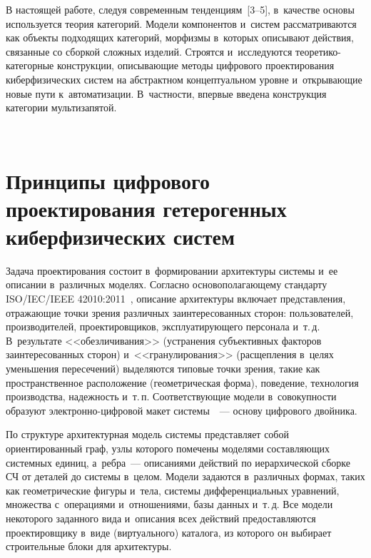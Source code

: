 \begin{multicols}{2}
В настоящей работе, следуя современным тенденциям~[3--5], в~качестве 
основы используется тео\-рия категорий. Модели компонентов и~систем 
рассматриваются как объекты подходящих категорий, морфизмы в~которых 
описывают действия, связанные со сборкой сложных изделий. Строятся 
и~исследуются тео\-ре\-ти\-ко-ка\-те\-гор\-ные конструкции, описывающие 
методы цифрового проектирования киберфизических систем на абстрактном 
концептуальном уровне и~открывающие новые пути к~автоматизации. 
В~частности, впервые введена конструкция категории мультизапятой.

\begin{figure*}[b] %
\vspace*{1pt}
 \begin{center}
 \mbox{%
 \epsfxsize=118mm  
 }
  \end{center}
\vspace*{-9pt}
\end{figure*}

\section{Принципы цифрового проектирования гетерогенных 
киберфизических систем}

Задача проектирования состоит в~формировании архитектуры системы и~ее 
описании в~различных моделях. Согласно основополагающему %
стандарту 
ISO/IEC/IEEE 42010:2011~\cite{6-kov}, описание \mbox{архитектуры} включает 
представления, отра\-жа\-ющие точки зрения различных заинтересованных 
сторон: пользователей, производителей, {проектировщиков}, эксплуатирующего 
персонала и~т.\,д. В~{результате} <<обезличивания>> (устранения субъективных 
факторов заинтересованных сторон) и~<<гранулирования>> (расщепления 
в~целях уменьшения пересечений) выделяются типовые точки зрения, такие 
как пространственное расположение %
(гео\-мет\-ри\-че\-ская форма), поведение, 
технология производства, надежность и~т.\,п. Со\-от\-вет\-ст\-ву\-ющие модели 
в~совокупности образуют элек\-т\-рон\-но-циф\-ро\-вой макет  
системы~\cite{7-kov}~--- основу циф\-ро\-во\-го двойника.
{

}

По структуре архитектурная модель системы представляет собой 
ориентированный граф, узлы которого помечены моделями составляющих 
сис\-тем\-ных единиц, а~ребра~--- описаниями действий по иерархической сборке 
СЧ от деталей до системы в~целом. Модели задаются 
в~различных формах, таких как геометрические фигуры и~тела, системы 
дифференциальных уравнений, множества с~операциями и~отношениями, базы 
данных и~т.\,д. Все модели некоторого заданного вида и~описания всех 
действий предоставляются проектировщику в~виде (виртуального) каталога, из 
которого он выбирает строительные блоки для архитектуры.


\end{multicols}
